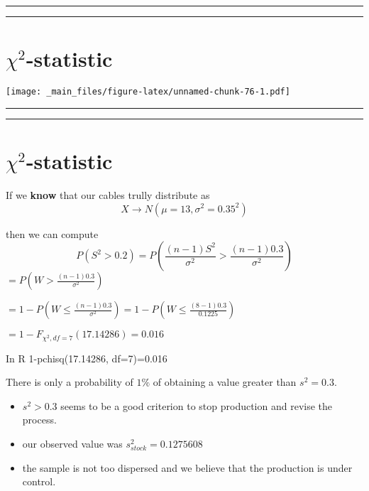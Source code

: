\documentclass[
]{book}
\begin{document}
\begin{center}\rule{0.5\linewidth}{0.5pt}\end{center}

\begin{center}\rule{0.5\linewidth}{0.5pt}\end{center}

\hypertarget{chi2-statistic}{%
\section{\texorpdfstring{\(\chi^2\)-statistic}{\textbackslash chi\^{}2-statistic}}\label{chi2-statistic}}

\texttt{[image: \_main\_files/figure-latex/unnamed-chunk-76-1.pdf]}

\begin{center}\rule{0.5\linewidth}{0.5pt}\end{center}

\begin{center}\rule{0.5\linewidth}{0.5pt}\end{center}

\hypertarget{chi2-statistic-1}{%
\section{\texorpdfstring{\(\chi^2\)-statistic}{\textbackslash chi\^{}2-statistic}}\label{chi2-statistic-1}}

If we \textbf{know} that our cables trully distribute as \[X \rightarrow N(\mu=13, \sigma^2=0.35^2)\]

then we can compute \[P(S^2 > 0.2)=P(\frac{(n-1)S^2}{\sigma^2} > \frac{(n-1)0.3}{\sigma^2})\]
\(=P(W > \frac{(n-1)0.3}{\sigma^2})\)

\(=1-P(W \leq \frac{(n-1)0.3}{\sigma^2})=1-P(W\leq \frac{(8-1)0.3}{0.1225})\)

\(= 1- F_{\chi^2,df=7}(17.14286)=0.016\)

In R
1-pchisq(17.14286, df=7)=0.016

There is only a probability of \(1\%\) of obtaining a value greater than \(s^2=0.3\).

\begin{itemize}
\item
  \(s^2>0.3\) seems to be a good criterion to stop production and revise the process.
\item
  our observed value was \(s^2_{stock}=0.1275608\)
\item
  the sample is not too dispersed and we believe that the production is under control.
\end{itemize}
\end{document}
